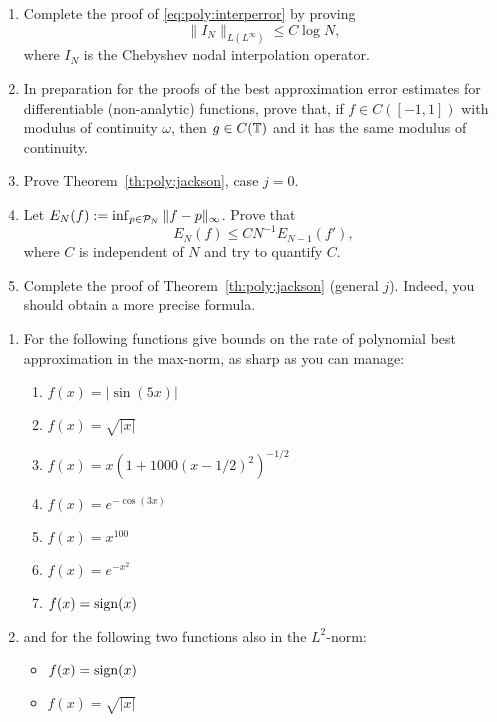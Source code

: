 \begin{exercise}
   \label{exr:poly:convergence}
   \begin{enumerate} \ilist
   \item Complete the proof of \eqref{eq:poly:interperror} by proving
      \[
         \| I_N \|_{L(L^\infty)} \leq C \log N,
      \]
      where $I_N$ is the Chebyshev nodal interpolation operator.

   \item In preparation for the proofs of the best approximation error estimates
      for differentiable (non-analytic) functions, prove that, if $f \in
      C([-1,1])$ with modulus of continuity $\omega$, then $g \in C(\mathbb{T})$ and it
      has the same modulus of continuity.

   \item Prove Theorem~\ref{th:poly:jackson}, case $j = 0$.

   \item Let $E_N(f) := \inf_{p \in \mathcal{P}_N} \|f - p\|_\infty$. Prove that 
      \[
         E_N(f)  \leq C N^{-1} E_{N-1}(f'),
      \]
      where $C$ is independent of $N$ and try to quantify $C$.

   \item Complete the proof of Theorem~\ref{th:poly:jackson} (general $j$).
   Indeed, you should obtain a more precise formula.
   \end{enumerate}
\end{exercise}

\begin{exercise} 
   \label{exr:poly:examplefunctions}
   \begin{enumerate} \ilist 
   \item For the following functions give bounds on the rate of polynomial best
   approximation in the max-norm, as sharp as you can manage: 
   \begin{enumerate} \ilist
      \item $f(x) = |\sin(5 x)|$ 
      \item $f(x) = \sqrt{|x|}$
      \item $f(x) = x (1 + 1000 (x - 1/2)^2)^{-1/2}$
      \item $f(x) = e^{- \cos(3x)}$
      \item $f(x) = x^{100}$
      \item $f(x) = e^{-x^2}$ 
      \item $f(x) = {\rm sign}(x)$
   \end{enumerate}
   \item and for the following two functions also in the $L^2$-norm:
   \begin{itemize}
      \item $f(x) = {\rm sign}(x)$
      \item $f(x) = \sqrt{|x|}$ \qedhere 
   \end{itemize}
   \end{enumerate}
\end{exercise}

